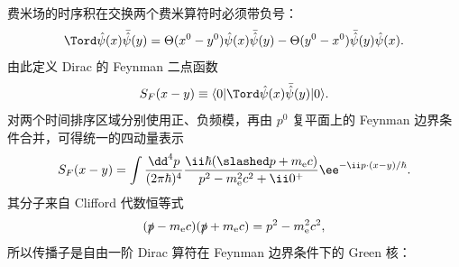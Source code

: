 费米场的时序积在交换两个费米算符时必须带负号：
\begin{equation}
 \Tord\hat\psi(x)\bar{\hat\psi}(y)
 =\Theta(x^0-y^0)\hat\psi(x)\bar{\hat\psi}(y)
 -\Theta(y^0-x^0)\bar{\hat\psi}(y)\hat\psi(x).
 \label{eq:fermion-time-order-r2}
\end{equation}
由此定义 Dirac 的 Feynman 二点函数
\begin{equation*}
 S_F(x-y)
 \equiv\langle0|\Tord\hat\psi(x)\bar{\hat\psi}(y)|0\rangle.
\end{equation*}
对两个时间排序区域分别使用正、负频模，再由 $p^0$ 复平面上的 Feynman 边界条件合并，可得统一的四动量表示
\begin{equation}
 {
 S_F(x-y)
 =\int\frac{\dd^4 p}{(2\pi\hbar)^4}
 \frac{\ii\hbar(\slashed p+m_{\mathrm e} c)}{p^2-m_{\mathrm e}^2c^2+\ii0^+}
 \ee^{-\ii p\cdot(x-y)/\hbar}.}
 \label{eq:dirac-prop-struct-r2}
\end{equation}
其分子来自 Clifford 代数恒等式
\begin{equation*}
 (\slashed p-m_{\mathrm e} c)(\slashed p+m_{\mathrm e} c)=p^2-m_{\mathrm e}^2c^2,
\end{equation*}
所以传播子是自由一阶 Dirac 算符在 Feynman 边界条件下的 Green 核：


